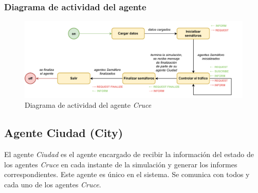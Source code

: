 \subsubsection{Diagrama de actividad del agente}
\begin{figure}[H]
    \centering
    \includegraphics[width=1\linewidth]{text/image/DAgen-DA-Crossroad.pdf}
    \caption{Diagrama de actividad del agente \textit{Cruce}}
    \label{fig:da_agente_cruce}
\end{figure}

\subsection{Agente Ciudad (City)}
El agente \textit{Ciudad} es el agente encargado de recibir la información del estado de los agentes \textit{Cruce} en cada instante de la simulación y generar los informes correspondientes. Este agente es único en el sistema. Se comunica con todos y cada uno de los agentes \textit{Cruce}.

